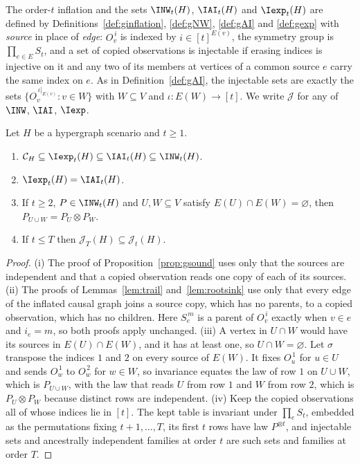 The order-$t$ inflation and the sets $\INW_t(H)$, $\IAI_t(H)$ and $\Iexp_t(H)$ are defined by Definitions~\ref{def:ginflation}, \ref{def:gNW}, \ref{def:gAI} and \ref{def:gexp} with \emph{source} in place of \emph{edge}: $O_v^{\,i}$ is indexed by $i\in[t]^{E(v)}$, the symmetry group is $\prod_{e\in E}S_t$, and a set of copied observations is injectable if erasing indices is injective on it and any two of its members at vertices of a common source $e$ carry the same index on $e$. As in Definition~\ref{def:gAI}, the injectable sets are exactly the sets $\{O_v^{\,\iota|_{E(v)}}:v\in W\}$ with $W\subseteq V$ and $\iota:E(W)\to[t]$. We write $\mathcal J$ for any of $\INW$, $\IAI$, $\Iexp$.

\begin{lemma}\label{lem:hcarry}
Let $H$ be a hypergraph scenario and $t\ge1$.
\begin{enumerate}[label=(\roman*),nosep]
\item $\Cscen{H}\subseteq\Iexp_t(H)\subseteq\IAI_t(H)\subseteq\INW_t(H)$.
\item $\Iexp_t(H)=\IAI_t(H)$.
\item If $t\ge2$, $P\in\INW_t(H)$ and $U,W\subseteq V$ satisfy $E(U)\cap E(W)=\varnothing$, then $P_{U\cup W}=P_U\otimes P_W$.
\item If $t\le T$ then $\mathcal J_T(H)\subseteq\mathcal J_t(H)$.
\end{enumerate}
\end{lemma}

\begin{proof}
(i) The proof of Proposition~\ref{prop:gsound} uses only that the sources are independent and that a copied observation reads one copy of each of its sources. (ii) The proofs of Lemmas~\ref{lem:trail} and~\ref{lem:rootsink} use only that every edge of the inflated causal graph joins a source copy, which has no parents, to a copied observation, which has no children. Here $S_e^{\,m}$ is a parent of $O_v^{\,i}$ exactly when $v\in e$ and $i_e=m$, so both proofs apply unchanged. (iii) A vertex in $U\cap W$ would have its sources in $E(U)\cap E(W)$, and it has at least one, so $U\cap W=\varnothing$. Let $\sigma$ transpose the indices $1$ and $2$ on every source of $E(W)$. It fixes $O_u^{\,1}$ for $u\in U$ and sends $O_w^{\,1}$ to $O_w^{\,2}$ for $w\in W$, so invariance equates the law of row $1$ on $U\cup W$, which is $P_{U\cup W}$, with the law that reads $U$ from row $1$ and $W$ from row $2$, which is $P_U\otimes P_W$ because distinct rows are independent. (iv) Keep the copied observations all of whose indices lie in $[t]$. The kept table is invariant under $\prod_eS_t$, embedded as the permutations fixing $t+1,\dots,T$, its first $t$ rows have law $P^{\otimes t}$, and injectable sets and ancestrally independent families at order $t$ are such sets and families at order $T$.
\end{proof}

